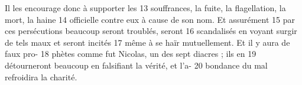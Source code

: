 Il les encourage donc à supporter les	 
13	 	souffrances, la fuite, la flagellation, la mort, la haine	 
14	 	officielle contre eux à cause de son nom. Et assurément	 
15	 	par ces persécutions beaucoup seront troublés, seront	 
16	 	scandalisés en voyant surgir de tels maux et seront incités	 
17	 	même à se haïr mutuellement. Et il y aura de faux pro-	 
18	 	phètes comme fut Nicolas, un des sept diacres ; ils en	 
19	 	détourneront beaucoup en falsifiant la vérité, et l'a-	 
20	 	bondance du mal refroidira la charité.